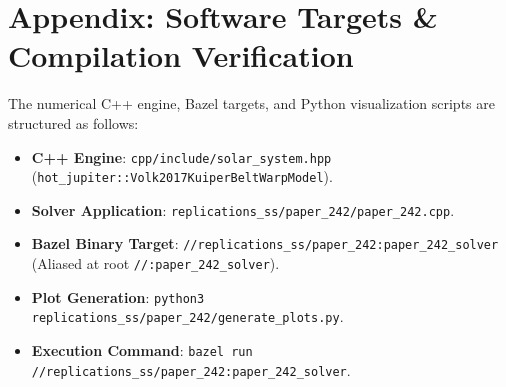 \documentclass[11pt,a4paper]{article}
\begin{document}
\section{Appendix: Software Targets \& Compilation Verification}
The numerical C++ engine, Bazel targets, and Python visualization scripts are structured as follows:
\begin{itemize}
  \item \textbf{C++ Engine}: \texttt{cpp/include/solar\_system.hpp} (\texttt{hot\_jupiter::Volk2017KuiperBeltWarpModel}).
  \item \textbf{Solver Application}: \texttt{replications\_ss/paper\_242/paper\_242.cpp}.
  \item \textbf{Bazel Binary Target}: \texttt{//replications\_ss/paper\_242:paper\_242\_solver} (Aliased at root \texttt{//:paper\_242\_solver}).
  \item \textbf{Plot Generation}: \texttt{python3 replications\_ss/paper\_242/generate\_plots.py}.
  \item \textbf{Execution Command}: \texttt{bazel run //replications\_ss/paper\_242:paper\_242\_solver}.
\end{itemize}
\end{document}

